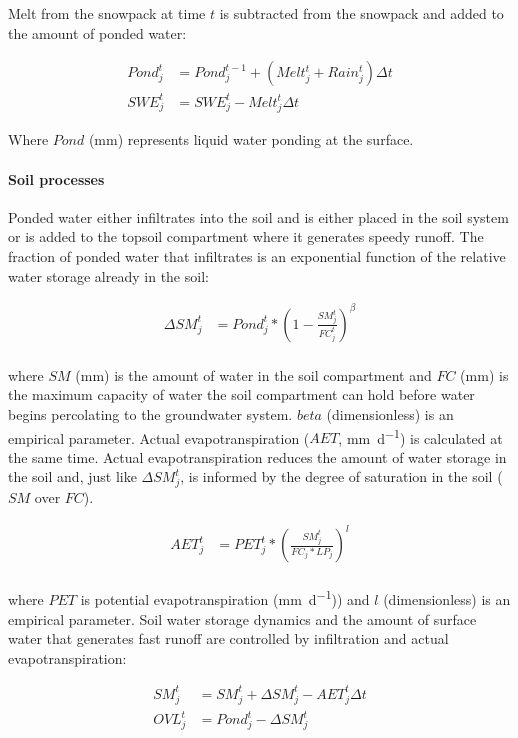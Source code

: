 Melt from the snowpack at time $t$ is subtracted from the snowpack and added to the amount of ponded water:

\begin{align}
Pond_j^t &= Pond_j^{t-1} + (Melt_j^t + Rain_j^t)\Delta t \\
SWE_j^t &= SWE_j^t - Melt_j^t \Delta t   
\end{align}

\noindent Where $Pond$ (\si{\milli\metre}) represents liquid water ponding at the surface.

\paragraph{Soil processes} 

Ponded water either infiltrates into the soil and is either placed in the soil system or is added to the topsoil compartment where it generates speedy runoff. The fraction of ponded water that infiltrates is an exponential function of the relative water storage already in the soil:

\begin{align}
\Delta SM_j^t &= Pond_j^t * \left(1 - \frac{SM_j^t}{FC_j^t} \right)^\beta \\
\end{align}

\noindent where $SM$ (\si{\milli\metre}) is the amount of water in the soil compartment and $FC$ (\si{\milli\metre}) is the maximum capacity of water the soil compartment can hold before water begins percolating to the groundwater system. $beta$ (dimensionless) is an empirical parameter. Actual evapotranspiration ($AET$, \si{\milli\metre\per\day}) is calculated at the same time. Actual evapotranspiration reduces the amount of water storage in the soil and, just like $\Delta SM_j^t$, is informed by the degree of saturation in the soil ($SM$ over $FC$).

\begin{align}
AET_j^t &= PET_j^t * \left(\frac{SM_j^t}{FC_j * LP_j} \right)^l  \\
\end{align}

\noindent where $PET$ is potential evapotranspiration (\si{\milli\metre\per\day})) and $l$ (dimensionless) is an empirical  parameter. Soil water storage dynamics and the amount of surface water that generates fast runoff are controlled by infiltration and actual evapotranspiration:

\begin{align}
SM_j^t &= SM_j^{t} + \Delta SM_j^t - AET_j^t \Delta t\\
OVL_j^t &= Pond_j^t - \Delta SM_j^t
\end{align}

